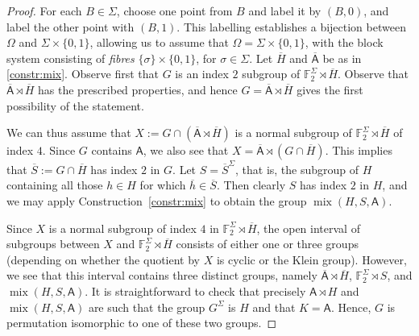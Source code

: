 \documentclass[a4paper]{amsart}
\newcommand{\FF}{\mathbb{F}}
\newcommand{\mix}{\mathop{\mathrm{mix}}}
\newcommand{\A}{\mathsf{A}}
\theoremstyle{definition}
\begin{document}
\begin{proof} 
For each $B \in \Sigma$, choose one point from $B$ and label it by $(B,0)$, and label the other point with $(B,1)$.
This labelling establishes a bijection between $\Omega$ and $ \Sigma \times \{0,1\}$, allowing us
to assume that $\Omega = \Sigma \times \{0,1\}$, with the block system consisting of \emph{fibres} $\{\sigma\} \times \{0,1\}$,
for $\sigma\in \Sigma$.
Let $\overline{H}$ and $\overline{\A}$ be as in \cref{constr:mix}. Observe first that $G$ is an index $2$ subgroup of $\FF_2^\Sigma \rtimes \overline{H}$. Observe that $\overline{\A} \rtimes \overline{H}$ has the prescribed properties, and hence $G=\overline{\A} \rtimes \overline{H}$ gives the first possibility of the statement.
 
We can thus assume that $X := G \cap (\overline{\A} \rtimes \overline{H})$ is a normal subgroup of $\FF_2^\Sigma \rtimes \overline{H}$ of index $4$.
 Since $G$ contains $\A$, we also see that $X = \overline{\A}\rtimes (G \cap \overline{H})$. 
 This implies that $\overline{S} := G \cap \overline{H}$ has index $2$ in $G$.
 Let $S = \overline{S}^\Sigma$, that is, the subgroup of $H$ containing all those $h\in H$ for which $\overline{h} \in \overline{S}$.
 Then clearly $S$ has index $2$ in $H$, and we may apply Construction~\ref{constr:mix} to obtain the group $\mix(H,S,\A)$.
 
 Since $X$ is a normal subgroup of index $4$ in $\FF_2^\Sigma \rtimes \overline{H}$,
the open interval of subgroups between $X$ and $\FF_2^\Sigma \rtimes \overline{H}$ consists of either one or three groups
(depending on whether the quotient by $X$ is cyclic or the Klein group). However, we see that this interval contains
three distinct groups, namely
 $\overline{\A} \rtimes \overline{H}$,
 $\FF_2^\Sigma \rtimes S$, 
 and $\mix(H,S,\A)$. It is straightforward to check that precisely $\A \rtimes H$ and $\mix(H,S,\A)$ are such that the group $G^\Sigma$ is $H$ and that $K = \A$.
 Hence, $G$ is permutation isomorphic to one of these two groups.
 \end{proof}
 
\end{document}
